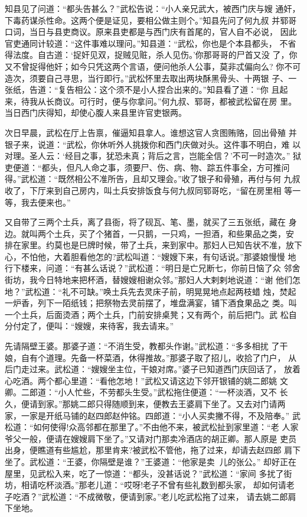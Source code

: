 知县见了问道：“都头告甚么？”武松告说：“小人亲兄武大，被西门庆与嫂
通奸，下毒药谋杀性命。这两个便是证见，要相公做主则个。”知县先问了何九叔
并郓哥口词，当日与县吏商议。原来县吏都是与西门庆有首尾的，官人自不必说，
因此官吏通同计较道：“这件事难以理问。”知县道：“武松，你也是个本县都头，
不省得法度。自古道：‘捉奸见双，捉贼见赃，杀人见伤。’你那哥哥的尸首又没
了，你又不曾捉得他奸；如今只凭这两个言语，便问他杀人公事，莫非忒偏向么?
你不可造次，须要自己寻思，当行即行。”武松怀里去取出两块酥黑骨头、十两银
子、一张纸，告道：“复告相公：这个须不是小人捏合出来的。”知县看了道：“你
且起来，待我从长商议。可行时，便与你拿问。”何九叔、郓哥，都被武松留在房
里。当日西门庆得知，却使心腹人来县里许官吏银两。

次日早晨，武松在厅上告禀，催逼知县拿人。谁想这官人贪图贿赂，回出骨殖
并银子来，说道：“武松，你休听外人挑拨你和西门庆做对头。这件事不明白，难
以对理。圣人云：‘经目之事，犹恐未真；背后之言，岂能全信？’不可一时造次。”
狱吏便道：“都头，但凡人命之事，须要尸、伤、病、物、踪五件事全，方可推问
得。”武松道：“既然相公不准所告，且却又理会。”收了银子和骨殖，再付与何
九叔收了，下厅来到自己房内，叫土兵安排饭食与何九叔同郓哥吃，“留在房里相
等一等，我去便来也。”

又自带了三两个土兵，离了县衙，将了砚瓦、笔、墨，就买了三五张纸，藏在
身边。就叫两个土兵，买了个猪首，一只鹅，一只鸡，一担酒，和些果品之类，安
排在家里。约莫也是巳牌时候，带了土兵，来到家中。那妇人已知告状不准，放下
心，不怕他，大着胆看他怎的?武松叫道：“嫂嫂下来，有句话说。”那婆娘慢慢
地行下楼来，问道：“有甚么话说？”武松道：“明日是亡兄断七，你前日恼了众
邻舍街坊，我今日特地来把杯酒，替嫂嫂相谢众邻。”那妇人大剌剌地说道：“谢
他们怎地？”武松道：“礼不可缺。”唤土兵先去灵床子前，明晃晃地点起两枝蜡
烛，焚起一炉香，列下一陌纸钱；把祭物去灵前摆了，堆盘满宴，铺下酒食果品之
类。叫一个土兵，后面烫酒；两个土兵，门前安排桌凳；又有两个，前后把门。武
松自分付定了，便叫：“嫂嫂，来待客，我去请来。”

先请隔壁王婆。那婆子道：“不消生受，教都头作谢。”武松道：“多多相扰
了干娘，自有个道理。先备一杯菜酒，休得推故。”那婆子取了招儿，收拾了门户，
从后门走过来。武松道：“嫂嫂坐主位，干娘对席。”婆子已知道西门庆回话了，
放着心吃酒。两个都心里道：“看他怎地！”武松又请这边下邻开银铺的姚二郎姚
文卿。二郎道：“小人忙些，不劳都头生受。”武松拖住便道：“一杯淡酒，又不
长久，便请到家。”那姚二郎只得随顺到来，便教去王婆肩下坐了。又去对门请两
家，一家是开纸马铺的赵四郎赵仲铭。四郎道：“小人买卖撇不得，不及陪奉。”
武松道：“如何使得!众高邻都在那里了。”不由他不来，被武松扯到家里道：“老
人家爷父一般，便请在嫂嫂肩下坐了。”又请对门那卖冷酒店的胡正卿。那人原是
吏员出身，便瞧道有些尴尬，那里肯来?被武松不管他，拖了过来，却请去赵四郎
肩下坐了。武松道：“王婆，你隔壁是谁？”王婆道：“他家是卖儿的张公。”
却好正在屋里，见武松入来，吃了一惊道：“都头，没甚话说？”武松道：“家间
多扰了街坊，相请吃杯淡酒。”那老儿道：“哎呀!老子不曾有些礼数到都头家，
却如何请老子吃酒？”武松道：“不成微敬，便请到家。”老儿吃武松拖了过来，
请去姚二郎肩下坐地。

